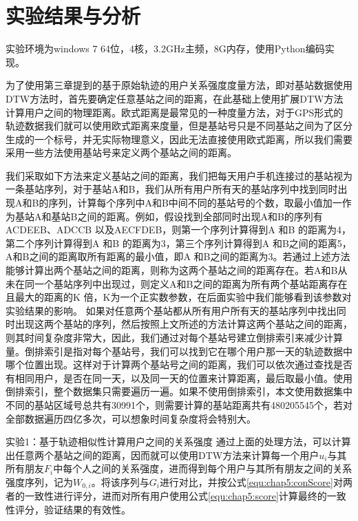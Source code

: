 \section{实验结果与分析}
\label{sec:section5-3}
实验环境为windows 7 64位，4核，3.2GHz主频，8G内存，使用Python编码实现。
\par 为了使用第三章提到的基于原始轨迹的用户关系强度度量方法，即对基站数据使用DTW方法时，首先要确定任意基站之间的距离，在此基础上使用扩展DTW方法计算用户之间的物理距离。欧式距离是最常见的一种度量方法，对于GPS形式的轨迹数据我们就可以使用欧式距离来度量，但是基站号只是不同基站之间为了区分生成的一个标号，并无实际物理意义，因此无法直接使用欧式距离，所以我们需要采用一些方法使用基站号来定义两个基站之间的距离。
\par 我们采取如下方法来定义基站之间的距离，我们把每天用户手机连接过的基站视为一条基站序列，对于基站A和B，我们从所有用户所有天的基站序列中找到同时出现A和B的序列，计算每个序列中A和B中间不同的基站号的个数，取最小值加一作为基站A和基站B之间的距离。例如，假设找到全部同时出现A和B的序列有ACDEEB、ADCCB 以及AECFDEB，则第一个序列计算得到A 和B 的距离为4，第二个序列计算得到A 和B 的距离为3，第三个序列计算得到A 和B之间的距离5，A和B之间的距离取所有距离的最小值，即A 和B之间的距离为3。若通过上述方法能够计算出两个基站之间的距离，则称为这两个基站之间的距离存在。若A和B从未在同一个基站序列中出现过，则定义A和B之间的距离为所有两个基站距离存在且最大的距离的K 倍，K为一个正实数参数，在后面实验中我们能够看到该参数对实验结果的影响。
如果对任意两个基站都从所有用户所有天的基站序列中找出同时出现这两个基站的序列，然后按照上文所述的方法计算这两个基站之间的距离，则其时间复杂度非常大，因此，我们通过对每个基站号建立倒排索引来减少计算量。倒排索引是指对每个基站号，我们可以找到它在哪个用户那一天的轨迹数据中哪个位置出现。这样对于计算两个基站号之间的距离，我们可以依次通过查找是否有相同用户，是否在同一天，以及同一天的位置来计算距离，最后取最小值。使用倒排索引，整个数据集只需要遍历一遍。如果不使用倒排索引，本文使用数据集中不同的基站区域号总共有30991个，则需要计算的基站距离共有480205545个，若对全部数据遍历四亿多次，可以想象时间复杂度将会特别大。
\par 实验1：基于轨迹相似性计算用户之间的关系强度
通过上面的处理方法，可以计算出任意两个基站之间的距离，因而就可以使用DTW方法来计算每一个用户$u_{i}$与其所有朋友$F_{i}$中每个人之间的关系强度，进而得到每个用户与其所有朋友之间的关系强度序列，记为$W_{0,i}$。将该序列与$G_{i}$进行对比，并按公式\ref{equ:chap5:conScore}对两者的一致性进行评分，进而对所有用户使用公式\ref{equ:chap5:score}计算最终的一致性评分，验证结果的有效性。
